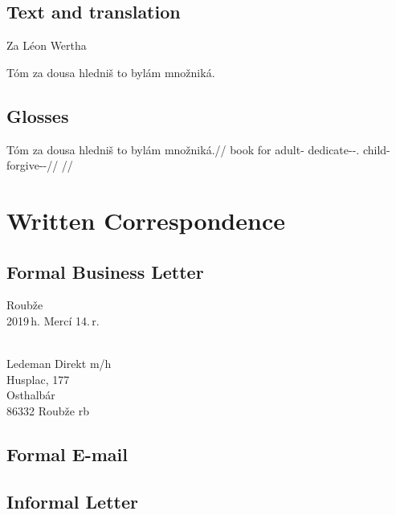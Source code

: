 \subsection{Text and translation}

Za L\'eon Wertha

T\'om za dousa hledni\v{s} to byl\'am mno\v{z}nik\'a.


\subsection{Glosses}

\pex
	\begingl
	\gla T\'om za dousa hledni\v{s} to byl\'am mno\v{z}nik\'a.//
	\glb book for adult-\Acc{} dedicate-\Pv{}-\Sbj{}.\Pf{} \Rz{} child-\Agt{} forgive-\Pv{}-\Hort{}//
	\glft {}//
	\endgl
\xe

\section{Written Correspondence}\label{sec:writcorr}

\subsection{Formal Business Letter}
{\small
\begin{flushright}
	Roubže\\
	2019\,h. Mercí 14.\,r.
\end{flushright}

\\
Ledeman Direkt {\sc m/h}\\
Husplac, \textnumero{} 177\\
Osthalbár\\
86332 Roubže {\sc rb}
}

\subsection{Formal E-mail}




\subsection{Informal Letter}
